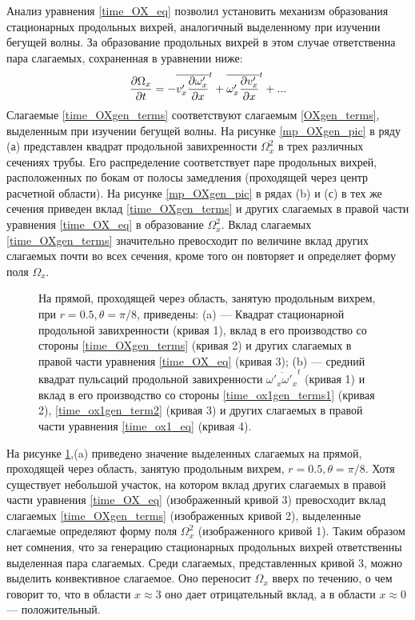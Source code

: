 Анализ уравнения \eqref{time_OX_eq} позволил установить механизм образования стационарных продольных вихрей, аналогичный выделенному при изучении бегущей волны. За образование продольных вихрей в этом случае ответственна пара слагаемых, сохраненная в уравнении ниже: 
\begin{equation} \label{time_OXgen_terms}
\frac{\partial \Omega_x}{\partial t} = - \overline{v'_x \frac{\partial \omega'_x}{\partial x}}^t + \overline{\omega'_x \frac{\partial v'_x}{\partial x}}^t + ... 
\end{equation}
Слагаемые \eqref{time_OXgen_terms} соответствуют слагаемым \eqref{OXgen_terms}, выделенным при изучении бегущей волны. На рисунке \ref{mp_OXgen_pic} в ряду (а) представлен квадрат продольной завихренности $\Omega_x^2$ в трех различных сечениях трубы. Его распределение соответствует паре продольных вихрей, расположенных по бокам от полосы замедления (проходящей через центр расчетной области). На рисунке \ref{mp_OXgen_pic} в рядах (b) и (с) в тех же сечения приведен вклад \eqref{time_OXgen_terms} и других слагаемых в правой части уравнения \eqref{time_OX_eq} в образование $\Omega_x^2$. Вклад слагаемых \eqref{time_OXgen_terms} значительно превосходит по величине вклад других слагаемых почти во всех сечения, кроме того он повторяет и определяет форму поля $\Omega_x$. 

\begin{figure}
\caption{На прямой, проходящей через область, занятую продольным вихрем, при $r = 0.5, \theta = \pi/8$, приведены: (a) --- Квадрат стационарной продольной завихренности (кривая 1), вклад в его производство со стороны \eqref{time_OXgen_terms} (кривая  2) и других слагаемых в правой части уравнения \eqref{time_OX_eq} (кривая 3); (b) --- средний квадрат пульсаций продольной завихренности $\overline{\omega'_x \omega'_x}^t$ (кривая 1) и вклад в его производство со стороны \eqref{time_ox1gen_terms1} (кривая  2), \eqref{time_ox1gen_term2} (кривая  3) и других слагаемых в правой части уравнения \eqref{time_ox1_eq} (кривая  4).}
\label{xline_oxgen_pic}
\end{figure}

На рисунке \ref{xline_oxgen_pic},(a) приведено значение выделенных слагаемых на прямой, проходящей через область, занятую продольным вихрем, $r = 0.5, \theta = \pi/8$. Хотя существует небольшой участок, на котором вклад других слагаемых в правой части уравнения \eqref{time_OX_eq} (изображенный кривой 3) превосходит вклад слагаемых \eqref{time_OXgen_terms} (изображенных кривой 2), выделенные слагаемые определяют форму поля $\Omega_x^2$ (изображенного кривой 1). Таким образом нет сомнения, что за генерацию стационарных продольных вихрей ответственны выделенная пара слагаемых. Среди слагаемых, представленных кривой 3, можно выделить конвективное слагаемое. Оно переносит $\Omega_x$ вверх по течению, о чем говорит то, что в области $x \approx 3$ оно дает отрицательный вклад, а в области $x \approx 0$ --- положительный. 


